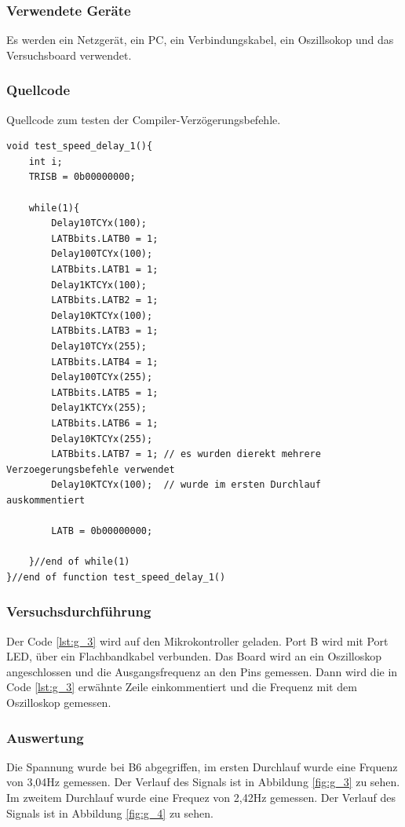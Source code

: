 \documentclass[12pt,a4paper]{article}
\begin{document}
\subsubsection*{Verwendete Geräte}

Es werden ein Netzgerät, ein PC, ein Verbindungskabel, ein Oszillsokop und das Versuchsboard verwendet.

\subsubsection*{Quellcode}

Quellcode zum testen der Compiler-Verzögerungsbefehle.

\lstset{language=C, basicstyle=\tiny}
\begin{lstlisting}[caption = {Geschwindigkeitstest mit Compiler-Verzögerungsbefehlen}, label=lst:g_3,captionpos=b]
void test_speed_delay_1(){
	int i;
	TRISB = 0b00000000;
	
	while(1){
		Delay10TCYx(100);
		LATBbits.LATB0 = 1;
		Delay100TCYx(100);
		LATBbits.LATB1 = 1;
		Delay1KTCYx(100);
		LATBbits.LATB2 = 1;
		Delay10KTCYx(100);
		LATBbits.LATB3 = 1;
		Delay10TCYx(255);
		LATBbits.LATB4 = 1;
		Delay100TCYx(255);
		LATBbits.LATB5 = 1;
		Delay1KTCYx(255);
		LATBbits.LATB6 = 1;
		Delay10KTCYx(255);
		LATBbits.LATB7 = 1;	// es wurden dierekt mehrere Verzoegerungsbefehle verwendet
		Delay10KTCYx(100);	// wurde im ersten Durchlauf auskommentiert
		
		LATB = 0b00000000;
		
	}//end of while(1)
}//end of function test_speed_delay_1()
\end{lstlisting}


\subsubsection*{Versuchsdurchführung}

Der Code \ref{lst:g_3} wird auf den Mikrokontroller geladen. Port B wird mit Port LED, über ein Flachbandkabel verbunden. Das Board wird an ein Oszilloskop angeschlossen und die Ausgangsfrequenz an den Pins gemessen. Dann wird die in Code \ref{lst:g_3} erwähnte Zeile einkommentiert und die Frequenz mit dem  Oszilloskop gemessen.


\subsubsection*{Auswertung}

Die Spannung wurde bei B6 abgegriffen, im ersten Durchlauf wurde eine Frquenz von 3,04Hz gemessen. Der Verlauf des Signals ist in Abbildung \ref{fig:g_3} zu sehen. Im zweitem Durchlauf wurde eine Frequez von 2,42Hz gemessen. Der Verlauf des Signals ist in Abbildung \ref{fig:g_4} zu sehen.
\end{document}
